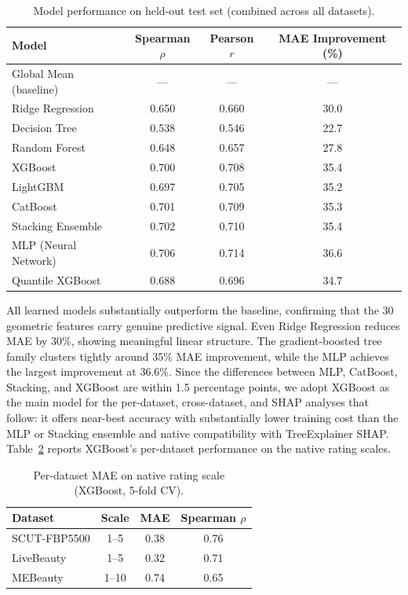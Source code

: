 \documentclass[a4paper,oneside,bibliography=totoc]{scrbook}
\begin{document}
\begin{table}[h]
\centering
\caption{Model performance on held-out test set (combined across all datasets).}
\label{tab:results}
\small
\begin{tabular}{lccc}
\toprule
\textbf{Model} & \textbf{Spearman $\rho$} & \textbf{Pearson $r$} & \textbf{MAE Improvement (\%)}\footnotemark \\
\midrule
Global Mean (baseline) & --- & --- & --- \\
Ridge Regression & 0.650 & 0.660 & 30.0 \\
Decision Tree & 0.538 & 0.546 & 22.7 \\
Random Forest & 0.648 & 0.657 & 27.8 \\
XGBoost & 0.700 & 0.708 & 35.4 \\
LightGBM & 0.697 & 0.705 & 35.2 \\
CatBoost & 0.701 & 0.709 & 35.3 \\
Stacking Ensemble & 0.702 & 0.710 & 35.4 \\
MLP (Neural Network) & 0.706 & 0.714 & 36.6 \\
Quantile XGBoost & 0.688 & 0.696 & 34.7 \\
\bottomrule
\end{tabular}
\end{table}

All learned models substantially outperform the baseline, confirming that the 30 geometric features carry genuine predictive signal. Even Ridge Regression reduces MAE by 30\%, showing meaningful linear structure. The gradient-boosted tree family clusters tightly around 35\% MAE improvement, while the MLP achieves the largest improvement at 36.6\%. Since the differences between MLP, CatBoost, Stacking, and XGBoost are within 1.5 percentage points, we adopt XGBoost as the main model for the per-dataset, cross-dataset, and SHAP analyses that follow: it offers near-best accuracy with substantially lower training cost than the MLP or Stacking ensemble and native compatibility with TreeExplainer SHAP. Table~\ref{tab:mae_native} reports XGBoost's per-dataset performance on the native rating scales.\\

\begin{table}[!htbp]
\centering
\caption{Per-dataset MAE on native rating scale (XGBoost, 5-fold CV).}
\label{tab:mae_native}
\small
\begin{tabular}{lccc}
\toprule
\textbf{Dataset} & \textbf{Scale} & \textbf{MAE} & \textbf{Spearman $\rho$} \\
\midrule
SCUT-FBP5500 & 1--5 & 0.38 & 0.76 \\
LiveBeauty & 1--5 & 0.32 & 0.71 \\
MEBeauty & 1--10 & 0.74 & 0.65 \\
\bottomrule
\end{tabular}
\end{table}
\end{document}
